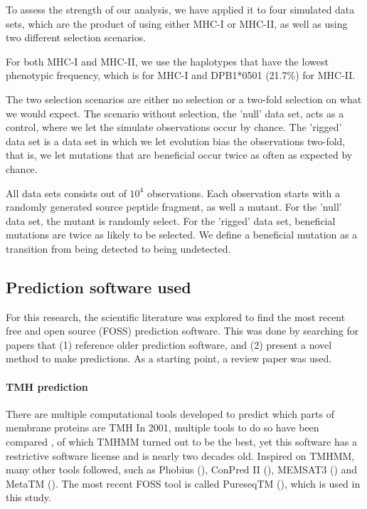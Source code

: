 To assess the strength of our analysis, 
we have applied it to four simulated data sets,
which are the product of using either MHC-I or MHC-II,
as well as using two different selection scenarios.

For both MHC-I and MHC-II, we use the haplotypes that have 
the lowest phenotypic frequency, which is  for MHC-I
and DPB1*0501 (21.7\%) for MHC-II.

The two selection scenarios are either no selection
or a two-fold selection on what we would expect.
The scenario without selection, the 'null' data set, acts 
as a control, where we let the simulate observations occur by chance. 
The 'rigged' data set is a data set in which we 
let evolution bias the observations two-fold, that is, 
we let mutations that are beneficial occur twice as often as expected by chance.

All data sets consists out of $10^4$ observations.
Each observation starts with a randomly generated source peptide fragment,
as well a mutant. For the 'null' data set, the mutant is randomly select.
For the 'rigged' data set, beneficial mutations are twice as likely to
be selected. We define a beneficial mutation as a transition from
being detected to being undetected.

\subsection{Prediction software used}

For this research, the scientific literature was explored 
to find the most recent free and open source (FOSS) prediction software.
This was done by searching for papers that (1) reference older
prediction software, and (2) present a novel method to make predictions.
As a starting point, a review paper was used.

\paragraph{TMH prediction}

There are multiple computational tools developed to predict which
parts of membrane proteins are TMH
In 2001, multiple tools to do so have been compared \cite{moller2001evaluation},
of which TMHMM \cite{krogh2001predicting} turned out to be the best, yet
this software has a restrictive software license and is nearly two
decades old. Inspired on TMHMM, many other tools followed, such as 
Phobius (\cite{kall2004combined}),
ConPred II (\cite{arai2004conpred}),
MEMSAT3 (\cite{jones2007improving})
and MetaTM (\cite{klammer2009metatm}).
The most recent FOSS tool is called PureseqTM (\cite{wang2019efficient}),
which is used in this study.

